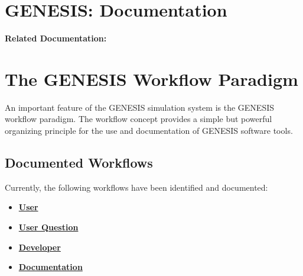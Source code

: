 \documentclass[12pt]{article}
\begin{document}
\section*{GENESIS: Documentation}

{\bf Related Documentation:}

\section*{The GENESIS Workflow Paradigm}

An important feature of the GENESIS simulation system is the GENESIS workflow
paradigm. The workflow concept provides a simple but powerful
organizing principle for the use and documentation of GENESIS software
tools.

\subsection*{Documented Workflows}
Currently, the following workflows have been identified and documented:
\begin{itemize}
\item \href{../workflow-user/workflow-user.tex}{\bf User}
\item \href{../workflow-user-query/workflow-user-query.tex}{\bf User Question}
\item \href{../workflow-developer/workflow-developer.tex}{\bf Developer}
\item \href{../workflow-documentation/workflow-documentation.tex}{\bf Documentation}
\end{itemize}
\end{document}
